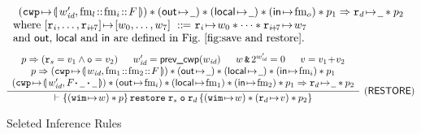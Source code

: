 \begin{figure*}[!thp]
{\begin{minipage}{1\linewidth}
\[\begin{array}{l}
{\begin{array}{c}
						\left(\frmst{\cwp'}
                                    {\fm_l \stCons \fm_i \stCons \Wstack}\right) *
						\Regs{\notCare}{\notCare}{\fm_o} * p_1
						\Rightarrow \regst{\reg{d}}{\notCare} * p_2
					\end{array}		
				}
            \\
            \text{where }[\reg{i},\dots,\reg{i\!+\!7}]\pto [\word_0,\dots,\word_7]
             \ \define \ \reg{i}\pto\word_0 * \dots * \reg{i\!+\!7}\pto\word_7 \\
            \mbox{and $\outRN$, $\localRN$ and $\inRN$ are defined in
            Fig.~\ref{fig:save and restore}.}
            \end{array}
			\]
%
%
%
			\[
				\infer[(\RULE{RESTORE})]
				{
					\wfins{(\regst{\regwim}{\word}) \sepstar \astP}
					{\crestore \; \reg{s} \; \oexp \; \reg{d}}
					{(\regst{\regwim}{\word}) \sepstar
					(\regst{\reg{d}}{\val}) \sepstar \astP_2}
				}
				{
					\begin{array}{c}
						p \Rightarrow
                           (\reg{s} = \val_1 \wedge \oexp = \val_2) \quad \; \;
						\cwp' = \postcwp(\cwp) \quad \; \;
						\word \,\bitAND\, 2^{\cwp'} = 0 \quad \;\;
						\val = \val_1\!+\!\val_2\\
						p \Rightarrow
						\left(\frmst{\cwp}
                                    {\fm_1 \stCons \fm_2\stCons \Wstack} \right) *
						(\OutRegs{\notCare})
                        * (\LocalRegs{\notCare}) * (\InRegs{\fm_i})
                        * p_1 \\
						\left(\frmst{\cwp'}{\Wstack
                                            \lstApp\, \notCare \,
                                            \lstApp\, \notCare}\right) *
						\Regs{\fm_i}{\fm_1}{\fm_2} * p_1 \Rightarrow
						\regst{\reg{d}}{\notCare} * p_2
					\end{array}
				}
			\]
		\end{minipage}
	}
	
	\caption{Seleted Inference Rules}
	\label{fig:Seleted Inference rules}
	\vspace{-0.2em}
\end{figure*}

